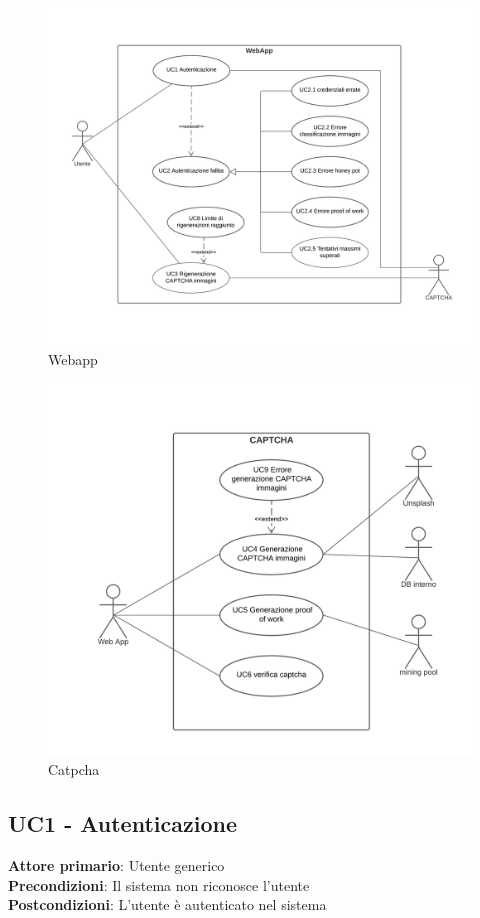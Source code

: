 \begin{figure}[H]
    \centering
    \includegraphics[scale=0.4]{img/web_app.png}
    \caption{Webapp}
\end{figure}
\begin{figure}[H]
    \centering
    \includegraphics[scale=0.4]{img/catpcha.png}
    \caption{Catpcha}
\end{figure}

\subsection{UC1 - Autenticazione}
\textbf{Attore primario}: Utente generico\\
\textbf{Precondizioni}: Il sistema non riconosce l'utente\\
\textbf{Postcondizioni}: L'utente è autenticato nel sistema\\

